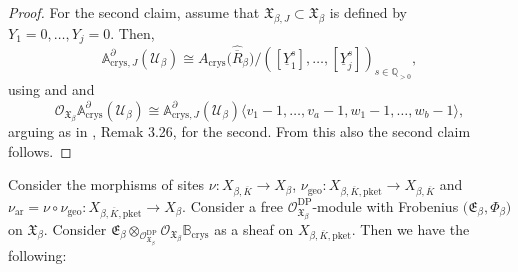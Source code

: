\documentclass[asterisque,english]{smfart}
\begin{document}
\begin{proof}



For the second claim, assume that  $\mathfrak{X}_{\beta,J}\subset \mathfrak{X}_\beta$ is defined by $Y_1=0,\ldots,Y_j=0$. Then, $$\mathbb{A}_{\mathrm{crys},J}^\partial(\mathcal{U}_\beta)\cong A_{\mathrm{crys}}\bigl(\widehat{\overline{R}}_\beta\bigr)/([\underline{Y}_1^s],\ldots, [\underline{Y}_j^s])_{s\in\mathbb{Q}_{>0}},$$using \cite[Cor.~2.5.4(1)]{LLZ} and \cite[Lemma 2.5.8]{LLZ} and $$ \mathcal{O}_{\mathfrak{X}_\beta} \mathbb{A}_{\mathrm{crys}}^\partial(\mathcal{U}_\beta)\cong \mathbb{A}_{\mathrm{crys},J}^\partial(\mathcal{U}_\beta) \langle v_1-1, \ldots, v_a-1,w_1-1,\ldots,w_b-1\rangle,$$arguing as in \cite[\S 3.4]{AI}, Remak 3.26, for the second. From this also the second claim follows.
\end{proof}

Consider the morphisms of sites $\nu \colon X_{\beta,\overline{K}} \to X_\beta$,  $\nu_{\mathrm{geo}}\colon X_{\beta,\overline{K},\mathrm{pket}}\to X_{\beta,\overline{K}}$ and $\nu_{\mathrm{ar}}=\nu\circ \nu_{\mathrm{geo}}\colon X_{\beta,\overline{K},\mathrm{pket}}\to X_\beta$. Consider a  free $\mathcal{O}_{\mathfrak{X}_\beta}^{\mathrm{DP}}$-module  with Frobenius  $\bigl(\mathfrak{E}_\beta,\Phi_\beta\bigr)$ on  $\mathfrak{X}_\beta$. Consider $ \mathfrak{E}_\beta\otimes_{\mathcal{O}_{\mathfrak{X}_\beta}^{\mathrm{DP}}}\mathcal{O}_{\mathfrak{X}_\beta}\mathbb{B}_{\mathrm{crys}}$ as a sheaf on $X_{\beta,\overline{K},\mathrm{pket}}$.  Then we have the following:
\end{document}
